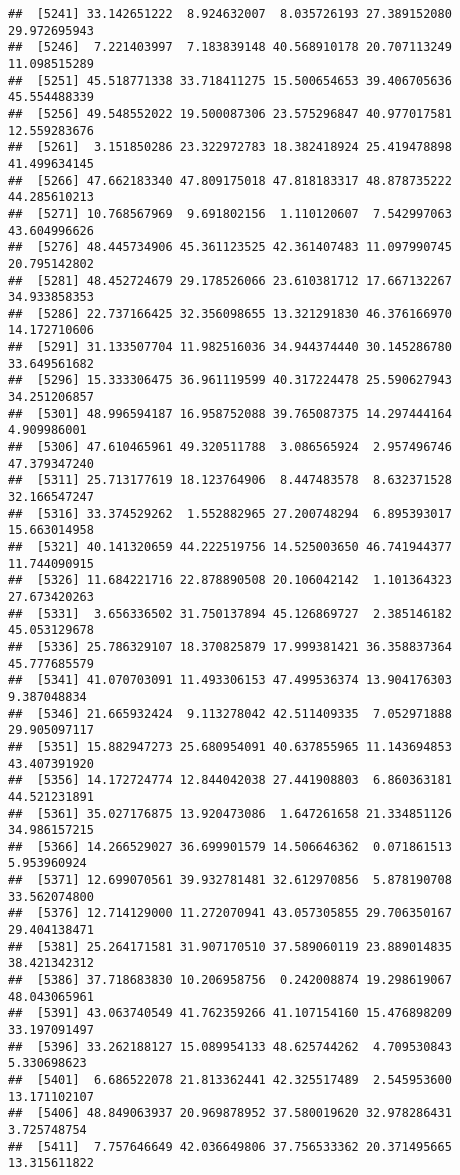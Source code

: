 \documentclass[
]{article}
\begin{document}
\begin{verbatim}
##  [5241] 33.142651222  8.924632007  8.035726193 27.389152080 29.972695943
##  [5246]  7.221403997  7.183839148 40.568910178 20.707113249 11.098515289
##  [5251] 45.518771338 33.718411275 15.500654653 39.406705636 45.554488339
##  [5256] 49.548552022 19.500087306 23.575296847 40.977017581 12.559283676
##  [5261]  3.151850286 23.322972783 18.382418924 25.419478898 41.499634145
##  [5266] 47.662183340 47.809175018 47.818183317 48.878735222 44.285610213
##  [5271] 10.768567969  9.691802156  1.110120607  7.542997063 43.604996626
##  [5276] 48.445734906 45.361123525 42.361407483 11.097990745 20.795142802
##  [5281] 48.452724679 29.178526066 23.610381712 17.667132267 34.933858353
##  [5286] 22.737166425 32.356098655 13.321291830 46.376166970 14.172710606
##  [5291] 31.133507704 11.982516036 34.944374440 30.145286780 33.649561682
##  [5296] 15.333306475 36.961119599 40.317224478 25.590627943 34.251206857
##  [5301] 48.996594187 16.958752088 39.765087375 14.297444164  4.909986001
##  [5306] 47.610465961 49.320511788  3.086565924  2.957496746 47.379347240
##  [5311] 25.713177619 18.123764906  8.447483578  8.632371528 32.166547247
##  [5316] 33.374529262  1.552882965 27.200748294  6.895393017 15.663014958
##  [5321] 40.141320659 44.222519756 14.525003650 46.741944377 11.744090915
##  [5326] 11.684221716 22.878890508 20.106042142  1.101364323 27.673420263
##  [5331]  3.656336502 31.750137894 45.126869727  2.385146182 45.053129678
##  [5336] 25.786329107 18.370825879 17.999381421 36.358837364 45.777685579
##  [5341] 41.070703091 11.493306153 47.499536374 13.904176303  9.387048834
##  [5346] 21.665932424  9.113278042 42.511409335  7.052971888 29.905097117
##  [5351] 15.882947273 25.680954091 40.637855965 11.143694853 43.407391920
##  [5356] 14.172724774 12.844042038 27.441908803  6.860363181 44.521231891
##  [5361] 35.027176875 13.920473086  1.647261658 21.334851126 34.986157215
##  [5366] 14.266529027 36.699901579 14.506646362  0.071861513  5.953960924
##  [5371] 12.699070561 39.932781481 32.612970856  5.878190708 33.562074800
##  [5376] 12.714129000 11.272070941 43.057305855 29.706350167 29.404138471
##  [5381] 25.264171581 31.907170510 37.589060119 23.889014835 38.421342312
##  [5386] 37.718683830 10.206958756  0.242008874 19.298619067 48.043065961
##  [5391] 43.063740549 41.762359266 41.107154160 15.476898209 33.197091497
##  [5396] 33.262188127 15.089954133 48.625744262  4.709530843  5.330698623
##  [5401]  6.686522078 21.813362441 42.325517489  2.545953600 13.171102107
##  [5406] 48.849063937 20.969878952 37.580019620 32.978286431  3.725748754
##  [5411]  7.757646649 42.036649806 37.756533362 20.371495665 13.315611822

\end{verbatim}
\end{document}
